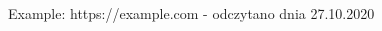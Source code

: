 \cleardoublepage
{}
{}

\begin{thebibliography}{99}





	Example: 
	https://example.com - odczytano dnia 27.10.2020

\end{thebibliography}


